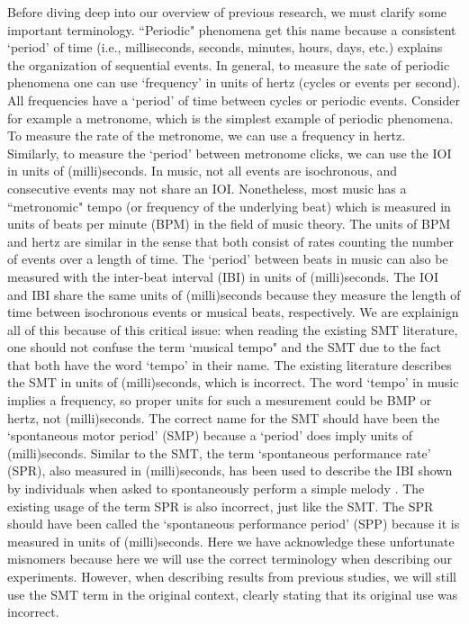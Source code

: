 \documentclass{report}
\begin{document}
Before diving deep into our overview of previous research, we must clarify some important terminology. ``Periodic" phenomena get this name because a consistent `period' of time (i.e., milliseconds, seconds, minutes, hours, days, etc.) explains the organization of sequential events. In general, to measure the sate of periodic phenomena one can use `frequency' in units of hertz (cycles or events per second). All frequencies have a `period' of time between cycles or periodic events. Consider for example a metronome, which is the simplest example of periodic phenomena. To measure the rate of the metronome, we can use a frequency in hertz. Similarly, to measure the `period' between metronome clicks, we can use the IOI in units of (milli)seconds. In music, not all events are isochronous, and consecutive events may not share an IOI. Nonetheless, most music has a ``metronomic" tempo (or frequency of the underlying beat) which is measured in units of beats per minute (BPM) in the field of music theory. The units of BPM and hertz are similar in the sense that both consist of rates counting the number of events over a length of time. The `period' between beats in music can also be measured with the inter-beat interval (IBI) in units of (milli)seconds. The IOI and IBI share the same units of (milli)seconds because they measure the length of time between isochronous events or musical beats, respectively. We are explainign all of this because of this critical issue: when reading the existing SMT literature, one should not confuse the term `musical tempo" and the SMT due to the fact that both have the word `tempo' in their name. The existing literature describes the SMT in units of (milli)seconds, which is incorrect. The word `tempo' in music implies a frequency, so proper units for such a mesurement could be BMP or hertz, not (milli)seconds. The correct name for the SMT should have been the `spontaneous motor period' (SMP) because a `period' does imply units of (milli)seconds. Similar to the SMT, the term `spontaneous performance rate' (SPR), also measured in (milli)seconds, has been used to describe the IBI shown by individuals when asked to spontaneously perform a simple melody \cite{zamm2016endogenous}. The existing usage of the term SPR is also incorrect, just like the SMT. The SPR should have been called the `spontaneous performance period' (SPP) because it is measured in units of (milli)seconds. Here we have acknowledge these unfortunate misnomers because here we will use the correct terminology when describing our experiments. However, when describing results from previous studies, we will still use the SMT term in the original context, clearly stating that its original use was incorrect. 
\end{document}
